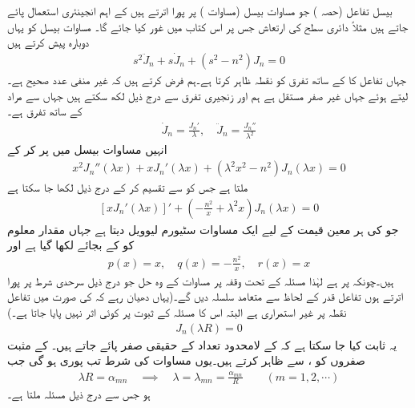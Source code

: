بیسل تفاعل (حصہ )  جو مساوات بیسل (مساوات  ) پر پورا اترتے ہیں کے  اہم انجینئری استعمال پائے جاتے ہیں مثلاً دائری سطح کی ارتعاش جس پر اس کتاب میں غور کیا جائے گا۔ مساوات بیسل کو یہاں دوبارہ پیش کرتے ہیں
\begin{align*}
s^2\ddot{J}_n+s\dot{J}_n+(s^2-n^2)J_n=0
\end{align*}
جہاں تفاعل کا  کے ساتھ تفرق کو نقطہ ظاہر کرتا ہے۔ہم فرض کرتے ہیں کہ  غیر منفی عدد صحیح ہے۔  لیتے ہوئے جہاں  غیر صفر مستقل ہے ہم  اور زنجیری تفرق سے درج ذیل لکھ سکتے ہیں جہاں  سے مراد  کے ساتھ تفرق ہے۔
\begin{align*}
\dot{J}_n=\frac{J_n'}{\lambda}, \quad \ddot{J}_n=\frac{J_n''}{\lambda^2}
\end{align*}
انہیں مساوات بیسل میں پر کر کے
\begin{align*}
x^2J_n''(\lambda x)+xJ_n'(\lambda x)+(\lambda^2 x^2-n^2)J_n(\lambda x)=0
\end{align*}
ملتا ہے جس کو  سے تقسیم کر کے درج ذیل لکھا جا سکتا ہے
\begin{align}\label{مساوات_طاقتی_بیسل_سٹیورم_الف}
[xJ_n'(\lambda x)]'+\left(-\frac{n^2}{x}+\lambda^2 x\right)J_n(\lambda x)=0
\end{align}
جو  کی ہر معین قیمت کے لیے ایک مساوات سٹیورم لیوویل دیتا ہے جہاں مقدار معلوم کو  کے بجائے  لکھا گیا ہے اور 
\begin{align*}
p(x)=x,\quad q(x)=-\frac{n^2}{x},\quad r(x)=x
\end{align*}
ہیں۔چونکہ  پر  ہے لہٰذا مسئلہ  کے تحت وقفہ  پر مساوات  کے وہ حل جو درج ذیل سرحدی شرط پر پورا اترتے ہوں تفاعل قدر  کے لحاظ سے  متعامد سلسلہ دیں گے۔(یہاں دھیان رہے کہ  کی صورت میں تفاعل  نقطہ  پر غیر استمراری ہے البتہ اس کا مسئلہ  کے ثبوت پر کوئی اثر نہیں پایا جاتا ہے۔)
\begin{align}\label{مساوات_طاقتی_بیسل_سٹیورم_ب}
J_n(\lambda R)=0
\end{align}
یہ ثابت کیا جا سکتا ہے کہ  کے لامحدود تعداد کے حقیقی صفر پائے جاتے ہیں۔  کے مثبت صفروں کو ، سے ظاہر کرتے ہیں۔یوں مساوات  کی شرط تب پوری ہو گی جب
\begin{align}\label{مساوات_طاقتی_بیسل_صفر_الف}
\lambda R=\alpha_{mn} \quad \implies \quad \lambda=\lambda_{mn}=\frac{\alpha_{mn}}{R} \quad \quad (m=1,2,\cdots)
\end{align}
ہو جس سے درج ذیل مسئلہ ملتا ہے۔


